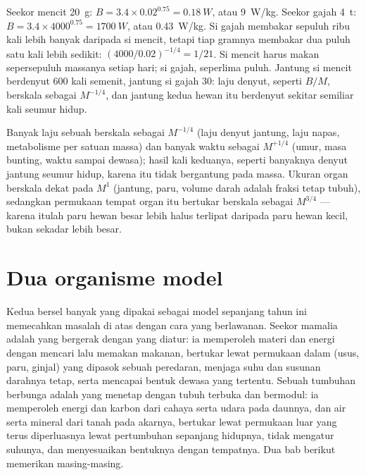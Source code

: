 \begin{example}\label{ex:b1:organism-environment:mouseelephant}
Seekor mencit \qty{20}{g}: $B = 3.4\times 0.02^{0.75} = \qty{0.18}{W}$,
atau \qty{9}{W/kg}. Seekor gajah \qty{4}{t}: $B = 3.4\times 4000^{0.75} =
\qty{1700}{W}$, atau \qty{0.43}{W/kg}. Si gajah membakar sepuluh ribu
kali lebih banyak daripada si mencit, tetapi tiap gramnya membakar dua
puluh satu kali lebih sedikit: $(4000/0.02)^{-1/4} = 1/21$. Si mencit
harus makan sepersepuluh massanya setiap hari; si gajah, seperlima
puluh. Jantung si mencit berdenyut \qty{600}{} kali semenit, jantung si
gajah \qty{30}{}: laju denyut, seperti $B/M$, berskala sebagai
$M^{-1/4}$, dan jantung kedua hewan itu berdenyut sekitar semiliar kali
seumur hidup.
\end{example}

\begin{remark}\label{rem:b1:organism-environment:consequences}
Banyak laju sebuah  berskala sebagai $M^{-1/4}$ (laju denyut
jantung, laju napas, metabolisme per satuan massa) dan banyak waktu
sebagai $M^{+1/4}$ (umur, masa bunting, waktu sampai dewasa); hasil kali
keduanya, seperti banyaknya denyut jantung seumur hidup, karena itu
tidak bergantung pada massa. Ukuran organ berskala dekat pada $M^{1}$
(jantung, paru, volume darah adalah fraksi tetap tubuh), sedangkan
permukaan tempat organ itu bertukar berskala sebagai $M^{3/4}$ ---
karena itulah paru hewan besar lebih halus terlipat daripada paru hewan
kecil, bukan sekadar lebih besar.
\end{remark}

\section{Dua organisme model}

\begin{proposition}\label{prop:b1:organism-environment:models}
Kedua  bersel banyak yang dipakai sebagai model sepanjang tahun
ini memecahkan masalah di atas dengan cara yang berlawanan. Seekor
mamalia adalah  yang bergerak dengan  yang
diatur: ia memperoleh materi dan energi dengan mencari lalu memakan
makanan, bertukar lewat permukaan dalam (usus, paru, ginjal) yang
dipasok sebuah peredaran, menjaga suhu dan susunan darahnya tetap, serta
mencapai bentuk dewasa yang tertentu. Sebuah tumbuhan berbunga adalah
 yang menetap dengan tubuh terbuka dan bermodul: ia
memperoleh energi dan karbon dari cahaya serta udara pada daunnya, dan
air serta mineral dari tanah pada akarnya, bertukar lewat permukaan luar
yang terus diperluasnya lewat pertumbuhan sepanjang hidupnya, tidak
mengatur suhunya, dan menyesuaikan bentuknya dengan tempatnya. Dua bab
berikut memerikan masing-masing.
\end{proposition}

